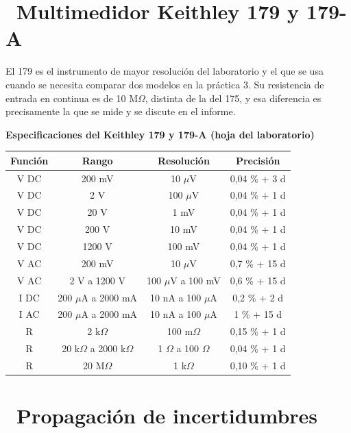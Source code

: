 \documentclass[11pt,a4paper]{article}
\newcommand{\iconotexto}[2]{\textcolor{cyanNeon}{\faIcon{#1}}~#2}
\begin{document}
\section{\iconotexto{paperclip}{Multimedidor Keithley 179 y 179-A}}

El 179 es el instrumento de mayor resolución del laboratorio y el que se usa cuando se necesita comparar dos modelos en la práctica 3. Su resistencia de entrada en continua es de 10 M$\Omega$, distinta de la del 175, y esa diferencia es precisamente la que se mide y se discute en el informe.

\begin{center}
\begin{minipage}{\linewidth}
\centering
{\small
\textbf{Especificaciones del Keithley 179 y 179-A (hoja del laboratorio)}\par\smallskip
\begin{tabular}{@{}cccc@{}}
\toprule
Función & Rango & Resolución & Precisión \\
\midrule
V DC & 200 mV & 10 $\mu$V & 0,04 \% + 3 d \\
V DC & 2 V & 100 $\mu$V & 0,04 \% + 1 d \\
V DC & 20 V & 1 mV & 0,04 \% + 1 d \\
V DC & 200 V & 10 mV & 0,04 \% + 1 d \\
V DC & 1200 V & 100 mV & 0,04 \% + 1 d \\
V AC & 200 mV & 10 $\mu$V & 0,7 \% + 15 d \\
V AC & 2 V a 1200 V & 100 $\mu$V a 100 mV & 0,6 \% + 15 d \\
I DC & 200 $\mu$A a 2000 mA & 10 nA a 100 $\mu$A & 0,2 \% + 2 d \\
I AC & 200 $\mu$A a 2000 mA & 10 nA a 100 $\mu$A & 1 \% + 15 d \\
R & 2 k$\Omega$ & 100 m$\Omega$ & 0,15 \% + 1 d \\
R & 20 k$\Omega$ a 2000 k$\Omega$ & 1 $\Omega$ a 100 $\Omega$ & 0,04 \% + 1 d \\
R & 20 M$\Omega$ & 1 k$\Omega$ & 0,10 \% + 1 d \\
\bottomrule
\end{tabular}
}\par{}
\end{minipage}
\end{center}

\section{\iconotexto{paperclip}{Propagación de incertidumbres}}
\end{document}
